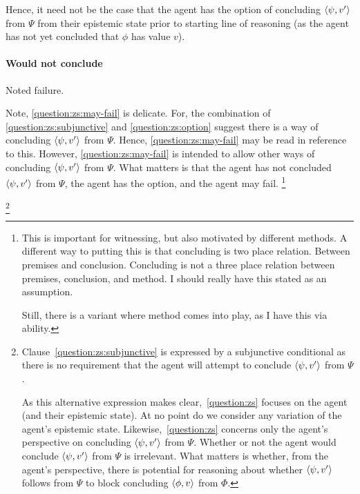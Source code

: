 \begin{note}
  Hence, it need not be the case that the agent has the option of concluding \(\langle \psi, v' \rangle\) from \(\Psi\) from their epistemic state prior to starting line of reasoning (as the agent has not yet concluded that \(\phi\) has value \(v\)).
\end{note}


\paragraph{Would not conclude}

\begin{note}
  Noted failure.
\end{note}

{
  \color{red}
  Note, \ref{question:zs:may-fail} is delicate.
  For, the combination of \ref{question:zs:subjunctive} and \ref{question:zs:option} suggest there is a way of concluding \(\langle \psi, v' \rangle\) from \(\Psi\).
  Hence, \ref{question:zs:may-fail} may be read in reference to this.
  However, \ref{question:zs:may-fail} is intended to allow other ways of concluding \(\langle \psi, v' \rangle\) from \(\Psi\).
  What matters is that the agent has not concluded \(\langle \psi, v' \rangle\) from \(\Psi\), the agent has the option, and the agent may fail.%
  \footnote{
    This is important for witnessing, but also motivated by different methods.
    A different way to putting this is that concluding is two place relation.
    Between premises and conclusion.
    Concluding is not a three place relation between premises, conclusion, and method.
    I should really have this stated as an assumption.

    Still, there is a variant where method comes into play, as I have this via ability.
  }
}

\footnote{
  Clause~\ref{question:zs:subjunctive} is expressed by a subjunctive conditional as there is no requirement that the agent will attempt to conclude \(\langle \psi, v' \rangle\) from \(\Psi\).

  \color{red}
  As this alternative expression makes clear,~\autoref{question:zs} focuses on the agent (and their epistemic state).
  At no point do we consider any variation of the agent's epistemic state.
  Likewise,~\autoref{question:zs} concerns only the agent's perspective on concluding \(\langle \psi, v' \rangle\) from \(\Psi\).
  Whether or not the agent would conclude \(\langle \psi, v' \rangle\) from \(\Psi\) is irrelevant.
  What matters is whether, from the agent's perspective, there is potential for reasoning about whether \(\langle \psi, v' \rangle\) follows from \(\Psi\) to block concluding \(\langle \phi, v \rangle\) from \(\Phi\).
}

